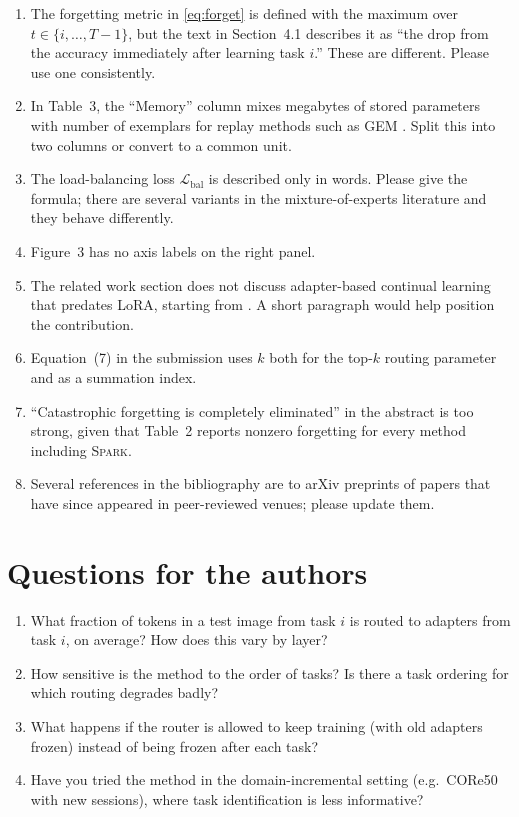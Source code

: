 \documentclass[11pt]{article}
\newcommand{\paper}{\textsc{Spark}}
\begin{document}
\begin{enumerate}[label=m\arabic*., start=1]
  \item The forgetting metric in \eqref{eq:forget} is defined with the maximum over $t \in \{i, \dots, T-1\}$, but the text in Section~4.1 describes it as ``the drop from the accuracy immediately after learning task $i$.'' These are different. Please use one consistently.
  \item In Table~3, the ``Memory'' column mixes megabytes of stored parameters with number of exemplars for replay methods such as GEM \citep{lopezpaz2017}. Split this into two columns or convert to a common unit.
  \item The load-balancing loss $\mathcal{L}_\text{bal}$ is described only in words. Please give the formula; there are several variants in the mixture-of-experts literature and they behave differently.
  \item Figure~3 has no axis labels on the right panel.
  \item The related work section does not discuss adapter-based continual learning that predates LoRA, starting from \citet{houlsby2019}. A short paragraph would help position the contribution.
  \item Equation~(7) in the submission uses $k$ both for the top-$k$ routing parameter and as a summation index.
  \item ``Catastrophic forgetting is completely eliminated'' in the abstract is too strong, given that Table~2 reports nonzero forgetting for every method including \paper{}.
  \item Several references in the bibliography are to arXiv preprints of papers that have since appeared in peer-reviewed venues; please update them.
\end{enumerate}

\section{Questions for the authors}

\begin{enumerate}[label=Q\arabic*.]
  \item What fraction of tokens in a test image from task $i$ is routed to adapters from task $i$, on average? How does this vary by layer?
  \item How sensitive is the method to the order of tasks? Is there a task ordering for which routing degrades badly?
  \item What happens if the router is allowed to keep training (with old adapters frozen) instead of being frozen after each task?
  \item Have you tried the method in the domain-incremental setting (e.g.\ CORe50 with new sessions), where task identification is less informative?
\end{enumerate}
\end{document}
